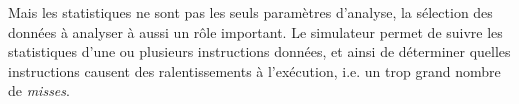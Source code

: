 Mais les statistiques ne sont pas les seuls paramètres d'analyse, la sélection des données à analyser à aussi un rôle important. Le simulateur permet de suivre les statistiques d'une ou plusieurs instructions données, et ainsi de déterminer quelles instructions causent des ralentissements à l'exécution, i.e. un trop grand nombre de \emph{misses}.


